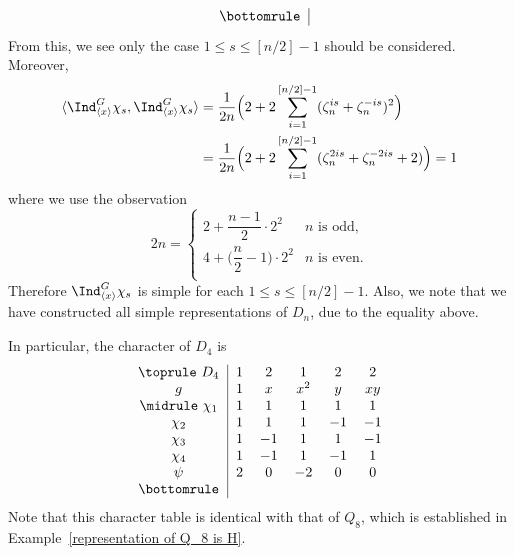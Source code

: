 \begin{example}
\[\begin{tabular}{c|cccccccc}
\bottomrule
\end{tabular}\]
From this, we see only the case $1\leq s\leq[n/2]-1$ should be considered. Moreover,
\begin{align*}
\langle\Ind^G_{\langle x\rangle}\chi_s,\Ind^G_{\langle x\rangle}\chi_s\rangle&=\frac{1}{2n}\Big(2+2\sum_{i=1}^{[n/2]-1}(\zeta_n^{is}+\zeta_n^{-is})^2\Big)\\
&=\frac{1}{2n}\Big(2+2\sum_{i=1}^{[n/2]-1}(\zeta_n^{2is}+\zeta_n^{-2is}+2)\Big)=1
\end{align*}
where we use the observation
\[2n=\begin{cases}
2+\dfrac{n-1}{2}\cdot 2^2&\text{$n$ is odd},\\[8pt]
4+\Big(\dfrac{n}{2}-1\Big)\cdot 2^2&\text{$n$ is even}.\\
\end{cases}\]
Therefore $\Ind^G_{\langle x\rangle}\chi_s$ is simple for each $1\leq s\leq[n/2]-1$. Also, we note that we have constructed all simple representations of $D_n$, due to the equality above.\par
In particular, the character of $D_4$ is
\[
\begin{tabular}{c|ccccccc}
\toprule
$D_4$&$1$&$2$&$1$&$2$&$2$\\
$g$&$1$&$x$&$x^2$&$y$&$xy$\\
\midrule
$\chi_{1}$&$1$&$1$&$1$&$1$&$1$\\
$\chi_{2}$&$1$&$1$&$1$&$-1$&$-1$\\
$\chi_{3}$&$1$&$-1$&$1$&$1$&$-1$\\
$\chi_{4}$&$1$&$-1$&$1$&$-1$&$1$\\
$\psi$&$2$&$0$&$-2$&$0$&$0$\\
\bottomrule
\end{tabular}
\]
Note that this character table is identical with that of $Q_8$, which is established in Example~\ref{representation of Q_8 is H}.
\end{example}
